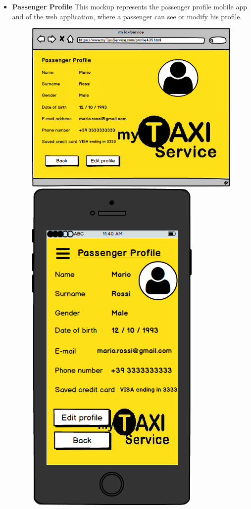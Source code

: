 \documentclass[18pt,oneside,a4paper, titlepage]{article}
\begin{document}
\begin{itemize}
\begin{figure}[h]
				\end{figure}
				\\ \\
				\item \textbf{Passenger Profile} This mockup represents the passenger profile mobile app and of the web application, where a passenger can see or modify his profile.\\
				\begin{figure}[h]
					\includegraphics[scale=0.3]{Mockups/WebAppPassengerProfile.png}%
					\qquad\qquad
					\includegraphics[scale=0.3]{Mockups/MobileAppPassengerProfile.png}

\end{figure}
\end{itemize}
\end{document}
